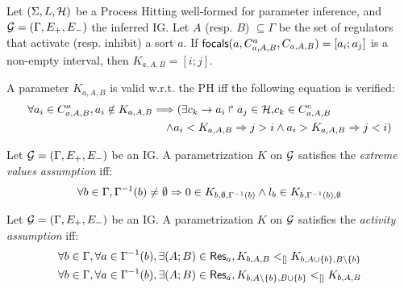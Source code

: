 \begin{proposition}
\label{pps:param_K}
Let $(\Sigma, L, \mathcal{H})$ be a Process Hitting well-formed for parameter inference, and $\mathcal{G} = (\Gamma,
E_+, E_-)$ the inferred IG.
Let $A$ (resp. $B$) $\subseteq \Gamma$ be the set of regulators that activate (resp. inhibit) a sort
$a$.
If $\mathsf{focals}(a,C^a_{a,A,B},C_{a,A,B})=[a_i;a_j]$ is a non-empty interval,
        then $K_{a,A,B} = [i;j]$.
\end{proposition}




\begin{property}\label{pro:K-valid}
A parameter $K_{a,A,B}$ is valid w.r.t. the PH iff the following equation is verified:
\begin{align*}
\forall a_i\in C^a_{a,A,B},
                a_i \notin K_{a,A,B} \Longrightarrow (
  \exists c_k\rightarrow a_i\Rsh a_j\in\mathcal{H}, & c_k \in C^c_{a,A,B} \\
 \wedge a_i < K_{a,A,B} \Rightarrow j > i
 & \wedge  a_i > K_{a,A,B} \Rightarrow j <i )
\end{align*}
\end{property}

\begin{property}
Let $\mathcal{G} = (\Gamma, E_+, E_-)$ be an IG. A parametrization $K$ on $\mathcal{G}$ satisfies the \emph{extreme values assumption} iff:
\label{prop:param_enum_extreme}
\[
  \forall b \in \Gamma, \Gamma^{-1}(b) \neq \emptyset \Rightarrow 0 \in K_{b,\emptyset,\Gamma^{-1}(b)} \wedge l_b \in K_{b,\Gamma^{-1}(b),\emptyset}
\]
\end{property}

\begin{property}
\label{prop:param_enum_activity}
Let $\mathcal{G} = (\Gamma, E_+, E_-)$ be an IG. A parametrization $K$ on $\mathcal{G}$ satisfies the \emph{activity assumption} iff:
\begin{align*}
  \forall b \in \Gamma, \forall a \in \Gamma^{-1}(b), \exists (A;B) \in \mathsf{Res}_{a}, K_{b,A,B} <_{[]} K_{b,A \cup \{b\},B \setminus \{b\}}
\\
  \forall b \in \Gamma, \forall a \in \Gamma^{-1}(b), \exists (A;B) \in \mathsf{Res}_{a}, K_{b,A \setminus \{b\},B \cup \{b\}} <_{[]} K_{b,A,B}
\end{align*}
\end{property}


